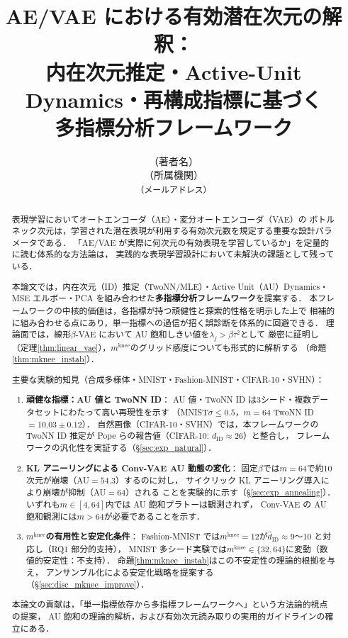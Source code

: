 \documentclass[11pt,a4paper]{jsarticle}
\title{AE/VAE における有効潜在次元の解釈：\\
       内在次元推定・Active-Unit Dynamics・再構成指標に基づく\\
       多指標分析フレームワーク}
\author{（著者名）\\
{\small （所属機関）}\\
{\small \texttt{（メールアドレス）}}}
\date{}
\newcommand{\mknee}{m^{\mathrm{knee}}}
\begin{document}
\maketitle

\begin{abstract}
表現学習においてオートエンコーダ（AE）・変分オートエンコーダ（VAE）の
ボトルネック次元は，学習された潜在表現が利用する有効次元数を規定する重要な設計パラメータである．
「AE/VAE が実際に何次元の有効表現を学習しているか」を定量的に読む体系的な方法論は，
実践的な表現学習設計において未解決の課題として残っている．

本論文では，内在次元（ID）推定（TwoNN/MLE）・Active Unit（AU）Dynamics・
MSE エルボー・PCA を組み合わせた\textbf{多指標分析フレームワーク}を提案する．
本フレームワークの中核的価値は，各指標が持つ頑健性と探索的性格を明示した上で
相補的に組み合わせる点にあり，単一指標への過信が招く誤診断を体系的に回避できる．
理論面では，線形$\beta$-VAE において AU 飽和しきい値を$\lambda_j > \beta\tau^2$として
厳密に証明し（定理\ref{thm:linear_vae}），$\mknee$のグリッド感度についても形式的に解析する
（命題\ref{thm:mknee_instab}）．

主要な実験的知見（合成多様体・MNIST・Fashion-MNIST・CIFAR-10・SVHN）：
\begin{enumerate}
  \item \textbf{頑健な指標：AU 値と TwoNN ID}：
        AU 値・TwoNN ID は3シード・複数データセットにわたって高い再現性を示す
        （MNIST$\sigma \leq 0.5$，$m=64$ TwoNN ID$= 10.03 \pm 0.12$）．
        自然画像（CIFAR-10・SVHN）では，本フレームワークの TwoNN ID 推定が
        Pope ら\cite{pope2021intrinsic}の報告値（CIFAR-10: $d_\mathrm{ID} \approx 26$）と整合し，
        フレームワークの汎化性を実証する（§\ref{sec:exp_natural}）．
  \item \textbf{KL アニーリングによる Conv-VAE AU 動態の変化}：
        固定$\beta$では$m=64$で約10次元が崩壊（AU$=54.3$）するのに対し，
        サイクリック KL アニーリング\cite{fu2019cyclical}導入により崩壊が抑制（AU$=64$）される
        ことを実験的に示す（§\ref{sec:exp_annealing}）．
        いずれも$m \in [4,64]$内では AU 飽和プラトーは観測されず，
        Conv-VAE の AU 飽和観測には$m > 64$が必要であることを示す．
  \item \textbf{$m^{\mathrm{knee}}$の有用性と安定化条件}：
        Fashion-MNIST では$m^{\mathrm{knee}} = 12$が$\hat{d}_\mathrm{ID} \approx 9$〜10 と対応し（RQ1 部分的支持），
        MNIST 多シード実験では$\mknee \in \{32, 64\}$に変動（数値的安定性：不支持）．
        命題\ref{thm:mknee_instab}はこの不安定性の理論的根拠を与え，
        アンサンブル化による安定化戦略を提案する（§\ref{sec:disc_mknee_improve}）．
\end{enumerate}

本論文の貢献は，「単一指標依存から多指標フレームワークへ」という方法論的視点の提案，
AU 飽和の理論的解析，および有効次元読み取りの実用的ガイドラインの確立にある．
\end{abstract}
\end{document}
